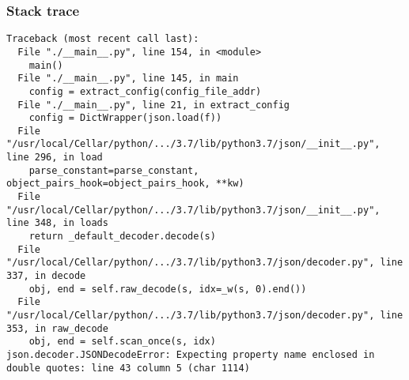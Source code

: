\begin{frame}[fragile]
    \frametitle{Stack trace}
    \begin{Verbatim}[fontsize=\tiny]
Traceback (most recent call last):
  File "./__main__.py", line 154, in <module>
    main()
  File "./__main__.py", line 145, in main
    config = extract_config(config_file_addr)
  File "./__main__.py", line 21, in extract_config
    config = DictWrapper(json.load(f))
  File "/usr/local/Cellar/python/.../3.7/lib/python3.7/json/__init__.py", line 296, in load
    parse_constant=parse_constant, object_pairs_hook=object_pairs_hook, **kw)
  File "/usr/local/Cellar/python/.../3.7/lib/python3.7/json/__init__.py", line 348, in loads
    return _default_decoder.decode(s)
  File "/usr/local/Cellar/python/.../3.7/lib/python3.7/json/decoder.py", line 337, in decode
    obj, end = self.raw_decode(s, idx=_w(s, 0).end())
  File "/usr/local/Cellar/python/.../3.7/lib/python3.7/json/decoder.py", line 353, in raw_decode
    obj, end = self.scan_once(s, idx)
json.decoder.JSONDecodeError: Expecting property name enclosed in double quotes: line 43 column 5 (char 1114)
    \end{Verbatim}
\end{frame}
